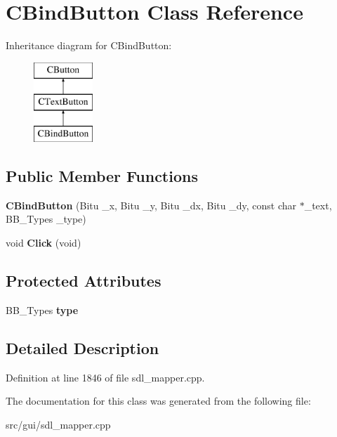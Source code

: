 \hypertarget{classCBindButton}{\section{C\-Bind\-Button Class Reference}
\label{classCBindButton}
}
Inheritance diagram for C\-Bind\-Button\-:\begin{figure}[H]
\begin{center}
\leavevmode
\includegraphics[height=3.000000cm]{classCBindButton}
\end{center}
\end{figure}
\subsection*{Public Member Functions}
\begin{DoxyCompactItemize}
\item 
\hypertarget{classCBindButton_ac88961b71a1666452f4d848f851259d9}{{\bfseries C\-Bind\-Button} (Bitu \-\_\-x, Bitu \-\_\-y, Bitu \-\_\-dx, Bitu \-\_\-dy, const char $\ast$\-\_\-text, B\-B\-\_\-\-Types \-\_\-type)}\label{classCBindButton_ac88961b71a1666452f4d848f851259d9}

\item 
\hypertarget{classCBindButton_a62e84c58b256b4b9f82d6ad1ca32be45}{void {\bfseries Click} (void)}\label{classCBindButton_a62e84c58b256b4b9f82d6ad1ca32be45}

\end{DoxyCompactItemize}
\subsection*{Protected Attributes}
\begin{DoxyCompactItemize}
\item 
\hypertarget{classCBindButton_a6d3fe3711c3f57f5e2ec7a2311408795}{B\-B\-\_\-\-Types {\bfseries type}}\label{classCBindButton_a6d3fe3711c3f57f5e2ec7a2311408795}

\end{DoxyCompactItemize}


\subsection{Detailed Description}


Definition at line 1846 of file sdl\-\_\-mapper.\-cpp.



The documentation for this class was generated from the following file\-:\begin{DoxyCompactItemize}
\item 
src/gui/sdl\-\_\-mapper.\-cpp\end{DoxyCompactItemize}
